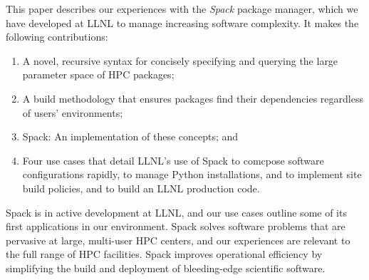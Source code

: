 This paper describes our experiences with the {\it Spack} package manager,
which we have developed at LLNL to manage increasing software complexity.
It makes the following contributions:
\begin{enumerate}
\item A novel, recursive syntax for concisely specifying and querying
      the large parameter space of HPC packages;
\item A build methodology that ensures packages find their dependencies
      regardless of users' environments;
\item Spack: An implementation of these concepts; and
\item Four use cases that detail LLNL's use of Spack to comcpose
      software configurations rapidly, to manage Python installations, and
      to implement site build policies, and to build an LLNL production code.
\end{enumerate}

\noindent Spack is in active development at LLNL, and our use cases outline some of
its first applications in our environment.  Spack solves software problems
that are pervasive at large, multi-user HPC centers, and our experiences
are relevant to the full range of HPC facilities.  Spack improves
operational efficiency by simplifying the build and deployment of
bleeding-edge scientific software.
